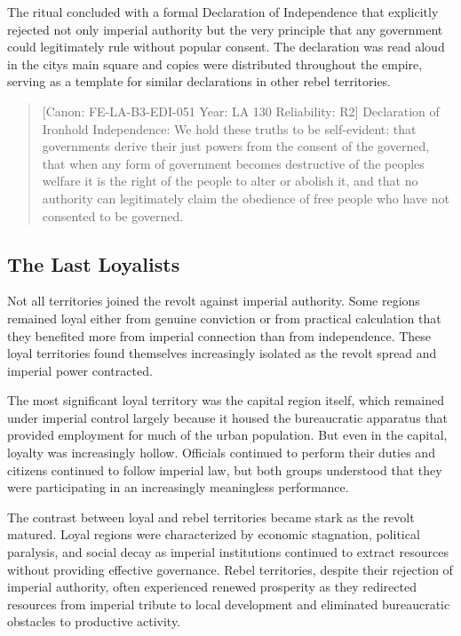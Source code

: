 The ritual concluded with a formal Declaration of Independence that
explicitly rejected not only imperial authority but the very principle
that any government could legitimately rule without popular consent. The
declaration was read aloud in the city\textquotesingle s main square and
copies were distributed throughout the empire, serving as a template for
similar declarations in other rebel territories.

\begin{quote}
{[}Canon: FE-LA-B3-EDI-051 \textbar{} Year: LA 130 \textbar{}
Reliability: R2{]} Declaration of Ironhold Independence: We hold these
truths to be self-evident: that governments derive their just powers
from the consent of the governed, that when any form of government
becomes destructive of the people\textquotesingle s welfare it is the
right of the people to alter or abolish it, and that no authority can
legitimately claim the obedience of free people who have not consented
to be governed.
\end{quote}

\subsection{The Last Loyalists}\label{the-last-loyalists}

Not all territories joined the revolt against imperial authority. Some
regions remained loyal either from genuine conviction or from practical
calculation that they benefited more from imperial connection than from
independence. These loyal territories found themselves increasingly
isolated as the revolt spread and imperial power contracted.

The most significant loyal territory was the capital region itself,
which remained under imperial control largely because it housed the
bureaucratic apparatus that provided employment for much of the urban
population. But even in the capital, loyalty was increasingly hollow.
Officials continued to perform their duties and citizens continued to
follow imperial law, but both groups understood that they were
participating in an increasingly meaningless performance.

The contrast between loyal and rebel territories became stark as the
revolt matured. Loyal regions were characterized by economic stagnation,
political paralysis, and social decay as imperial institutions continued
to extract resources without providing effective governance. Rebel
territories, despite their rejection of imperial authority, often
experienced renewed prosperity as they redirected resources from
imperial tribute to local development and eliminated bureaucratic
obstacles to productive activity.

